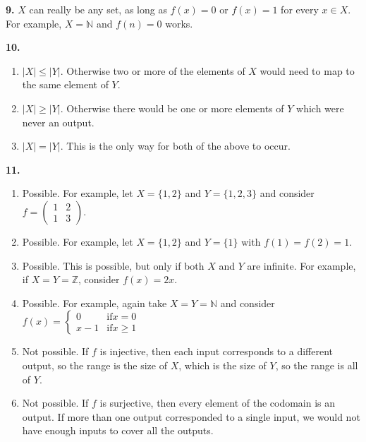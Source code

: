 \documentclass[10pt,]{book}
\theoremstyle{plain}
\theoremstyle{definition}
\theoremstyle{definition}
\theoremstyle{definition}
\numberwithin{equation}{chapter}
\def\N{\mathbb N}
\def\Z{\mathbb Z}
\newcommand{\amp}{ & }
\begin{document}
\par\smallskip
\noindent\textbf{9.}\quad{}
            \(X\) can really be any set, as long as \(f(x) = 0\) or \(f(x) = 1\) for every \(x \in X\). For example, \(X = \N\) and \(f(n) = 0\) works.
\par\smallskip
\noindent\textbf{10.}\quad{}\leavevmode%
\begin{enumerate}[label=(\alph*)]
\item\hypertarget{li-348}{}\(|X| \le |Y|\). Otherwise two or more of the elements of \(X\) would need to map to the same element of \(Y\).%
\item\hypertarget{li-349}{}\(|X| \ge |Y|\). Otherwise there would be one or more elements of \(Y\) which were never an output.%
\item\hypertarget{li-350}{}\(|X| = |Y|\). This is the only way for both of the above to occur.%
\end{enumerate}
\par\smallskip
\noindent\textbf{11.}\quad{}\leavevmode%
\begin{enumerate}[label=(\alph*)]
\item\hypertarget{li-357}{} Possible. For example, let \(X=\{1,2\}\) and \(Y = \{1,2,3\}\) and consider \(f=\begin{pmatrix}1 \amp 2 \\ 1 \amp 3\end{pmatrix}\). %
\item\hypertarget{li-358}{} Possible. For example, let \(X = \{1,2\}\) and \(Y = \{1\}\) with \(f(1) = f(2) = 1\).%
\item\hypertarget{li-359}{} Possible. This is possible, but only if both \(X\) and \(Y\) are infinite. For example, if \(X = Y = \Z\), consider \(f(x) = 2x\).%
\item\hypertarget{li-360}{} Possible. For example, again take \(X = Y = \N\) and consider \(f(x) = \begin{cases} 0 \amp \mathrm{ if } x = 0 \\ x-1 \amp \mathrm{ if } x \ge 1\end{cases}\)%
\item\hypertarget{li-361}{} Not possible. If \(f\) is injective, then each input corresponds to a different output, so the range is the size of \(X\), which is the size of \(Y\), so the range is all of \(Y\).%
\item\hypertarget{li-362}{} Not possible. If \(f\) is surjective, then every element of the codomain is an output. If more than one output corresponded to a single input, we would not have enough inputs to cover all the outputs.%
\end{enumerate}
\end{document}
